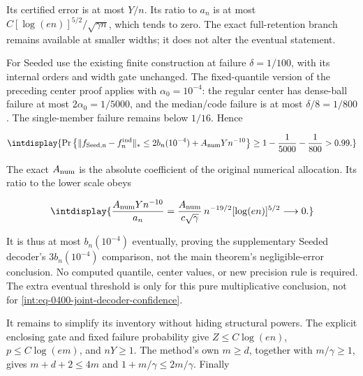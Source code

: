 
Its certified error is at most \(Y/n\). Its ratio to \(a_n\) is at most \(C[\log(en)]^{5/2}/\sqrt{\gamma n}\), which tends to zero. The exact full-retention branch remains available at smaller widths; it does not alter the eventual statement.



For Seeded use the existing finite construction at failure \(\delta=1/100\), with its internal orders and width gate unchanged. The fixed-quantile version of the preceding center proof applies with \(\alpha_0=10^{-4}\): the regular center has dense-ball failure at most \(2\alpha_0=1/5000\), and the median/code failure is at most \(\delta/8=1/800\). The single-member failure remains below \(1/16\). Hence


\begingroup\renewcommand{\theHequation}{intdisplay.823}
\begin{equation}
\intdisplay{
\Pr\left\{\|f_{\rm Seed,n}-f_n^{\rm ind}\|_*
\le2b_n(10^{-4})+A_{\rm num}Yn^{-10}\right\}
\ge1-\frac1{5000}-\frac1{800}>0.99.
}
\label{int:eq-0400-joint-decoder-confidence}
\end{equation}
\endgroup


The exact \(A_{\rm num}\) is the absolute coefficient of the original numerical allocation. Its ratio to the lower scale obeys


\begingroup\renewcommand{\theHequation}{intdisplay.824}
\begin{equation}
\intdisplay{
\frac{A_{\rm num}Yn^{-10}}{a_n}
=\frac{A_{\rm num}}{c\sqrt\gamma}\,
n^{-19/2}[\log(en)]^{5/2}\longrightarrow0.
}
\label{int:eq-0401-joint-numerical-absorption}
\end{equation}
\endgroup


It is thus at most \(b_n(10^{-4})\) eventually, proving the supplementary Seeded decoder's \(3b_n(10^{-4})\) comparison, not the main theorem's negligible-error conclusion. No computed quantile, center values, or new precision rule is required. The extra eventual threshold is only for this pure multiplicative conclusion, not for \eqref{int:eq-0400-joint-decoder-confidence}.



It remains to simplify its inventory without hiding structural powers. The explicit enclosing gate and fixed failure probability give \(Z\le C\log(en)\), \(p\le C\log(em)\), and \(nY\ge1\). The method's own \(m\ge d\), together with \(m/\gamma\ge1\), gives \(m+d+2\le4m\) and \(1+m/\gamma\le2m/\gamma\). Finally


